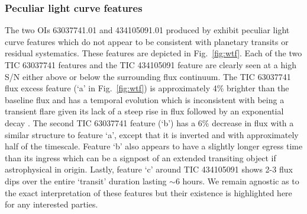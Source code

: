 \iffalse
\subsubsection{Peculiar light curve features}
The two OIs 63037741.01 and 434105091.01 produced by \pipeline{} exhibit peculiar
light curve features which do not appear to be consistent with planetary transits or residual systematics.
These features are depicted in Fig.~\ref{fig:wtf}. Each of the two TIC 63037741 features and the
TIC 434105091 feature are clearly seen at a high S/N either above or below the surrounding flux continuum.
The TIC 63037741 flux excess feature (`a' in Fig.~\ref{fig:wtf}) is approximately 4\% brighter than the baseline
flux and has a temporal evolution which is inconsistent with being a transient flare given its lack of a steep rise
in flux followed by an exponential decay \citep{hawley14}. The second TIC 63037741 feature (`b') has a 6\%
decrease in flux with a similar structure to feature `a', except that it is inverted and with approximately half
of the timescale. Feature `b' also appears to have
a slightly longer egress time than its ingress which can be a signpost of an extended transiting object if
astrophysical in origin.
Lastly, feature `c' around TIC 434105091 shows 2-3 flux dips over the entire `transit' duration lasting
$\sim 6$ hours. We remain agnostic as to the exact interpretation of these features but their existence is highlighted
here for any interested parties.

